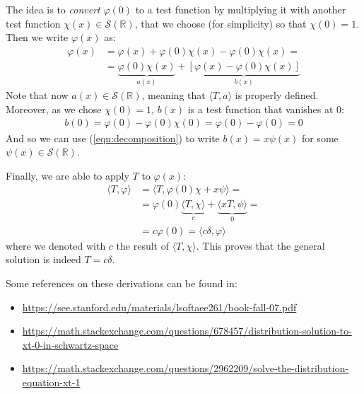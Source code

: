 \documentclass[../template.tex]{subfiles}
\begin{document}
\begin{expl}
    The idea is to \textit{convert} $\varphi(0)$ to a test function by multiplying it with another test function $\chi(x) \in \mathcal{S}(\mathbb{R})$, that we choose (for simplicity) so that $\chi(0) = 1$. Then we write $\varphi(x)$ as:
    \begin{align*}
        \varphi(x) &= \varphi(x) + \varphi(0)\chi(x) - \varphi(0) \chi(x) = \\
        &= \underbrace{\varphi(0)\chi(x)}_{a(x)} + \underbrace{[\varphi(x) - \varphi(0) \chi(x)]}_{b(x)} 
    \end{align*}
    Note that now $a(x) \in \mathcal{S}(\mathbb{R})$, meaning that $\langle T, a \rangle$ is properly defined. Moreover, as we chose $\chi(0) = 1$, $b(x)$ is a test function that vanishes at $0$:
    \begin{align*}
        b(0) = \varphi(0) - \varphi(0) \chi(0) = \varphi(0) - \varphi(0) = 0
    \end{align*}
    And so we can use (\ref{eqn:decomposition}) to write $b(x) = x \psi(x)$ for some $\psi(x) \in \mathcal{S}(\mathbb{R})$. 

    Finally, we are able to apply $T$ to $\varphi(x)$:
    \begin{align*}
        \langle T, \varphi \rangle &= \langle T, \varphi(0) \chi + x \psi \rangle =\\
        &= \varphi(0) \underbrace{\langle T, \chi \rangle}_{c}  + \underbrace{\langle x T, \psi \rangle}_{0} =\\
        &= c \varphi(0) = \langle c \delta, \varphi \rangle
    \end{align*}
    where we denoted with $c$ the result of $\langle T, \chi \rangle$. This proves that the general solution is indeed $T = c \delta$.

    \medskip

    Some references on these derivations can be found in:
    \begin{itemize}
        \item \url{https://see.stanford.edu/materials/lsoftaee261/book-fall-07.pdf}
        \item \parbox{30em}{\url{https://math.stackexchange.com/questions/678457/distribution-solution-to-xt-0-in-schwartz-space}}
        \item \parbox{30em}{\url{https://math.stackexchange.com/questions/2962209/solve-the-distribution-equation-xt-1}}
    \end{itemize}
    
\end{expl}
\end{document}
